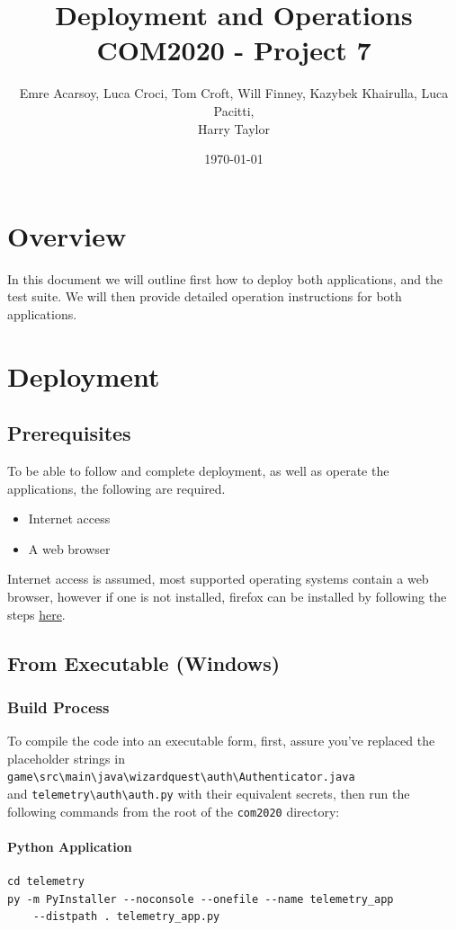 \documentclass[11pt]{article}
\title{Deployment and Operations\\[0.3em]
\large COM2020 - Project 7}
\author{Emre Acarsoy, Luca Croci, Tom Croft, Will Finney, Kazybek Khairulla, Luca Pacitti, \\ Harry Taylor}
\date{\today}
\begin{document}
\maketitle
\tableofcontents
\newpage
\section{Overview}
In this document we will outline first how to deploy both applications, and the test suite. We will then provide detailed operation instructions for both applications.

\section{Deployment}
\subsection{Prerequisites}
To be able to follow and complete deployment, as well as operate the applications, the following are required.
\begin{itemize}
  \item Internet access
  \item A web browser
\end{itemize}

Internet access is assumed, most supported operating systems contain a web browser, however if one is not installed, firefox can be installed by following the steps \href{https://www.firefox.com/en-US/download}{here}.

\subsection{From Executable (Windows)}

\subsubsection{Build Process}
To compile the code into an executable form, first, assure you've replaced the placeholder strings in \verb|game\src\main\java\wizardquest\auth\Authenticator.java|\\ and \verb|telemetry\auth\auth.py| with their equivalent secrets, then run the following commands from the root of the \verb|com2020| directory:

\paragraph{Python Application}
\begin{verbatim}
cd telemetry
py -m PyInstaller --noconsole --onefile --name telemetry_app 
    --distpath . telemetry_app.py
\end{verbatim}
\end{document}
